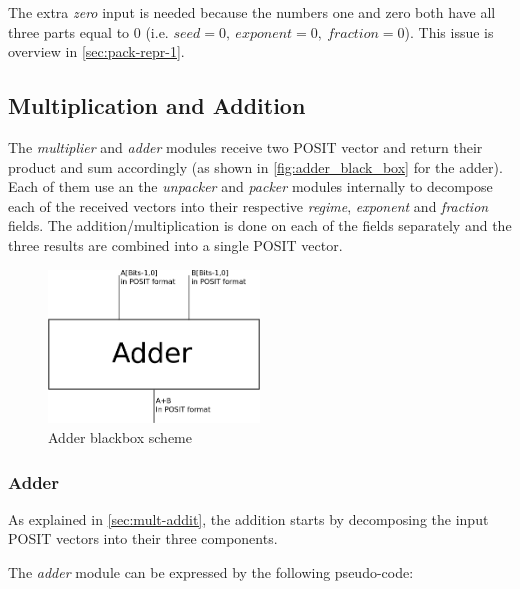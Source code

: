 \documentclass[10pt]{article}
\begin{document}
The extra \textit{zero} input is needed because the numbers one and zero both
have all three parts equal to 0 (i.e. $seed=0,\ exponent=0,\ fraction=0$).
This issue is overview in \autoref{sec:pack-repr-1}.

\subsection{Multiplication and Addition}\label{sec:mult-addit}

The \textit{multiplier} and \textit{adder} modules receive two POSIT vector and return
their product and sum accordingly (as shown in \autoref{fig:adder_black_box} for
the adder).
Each of them use an the \textit{unpacker} and \textit{packer}
modules internally to decompose each of the received vectors into their
respective \textit{regime}, \textit{exponent} and \textit{fraction} fields.
The addition/multiplication is done on each of the fields separately and the
three results are combined into a single POSIT vector.

\begin{figure}[h]
  \centering
  \includegraphics*[width=0.5\textwidth, height=0.2\paperheight]{adder_blackbox}
  \caption{Adder blackbox scheme}
  \label{fig:adder_black_box}
\end{figure}

\subsubsection{Adder}\label{sec:adder}

As explained in \autoref{sec:mult-addit}, the addition starts by decomposing the
input POSIT vectors into their three components.

The \textit{adder} module can be expressed by the following pseudo-code: \\
\end{document}
